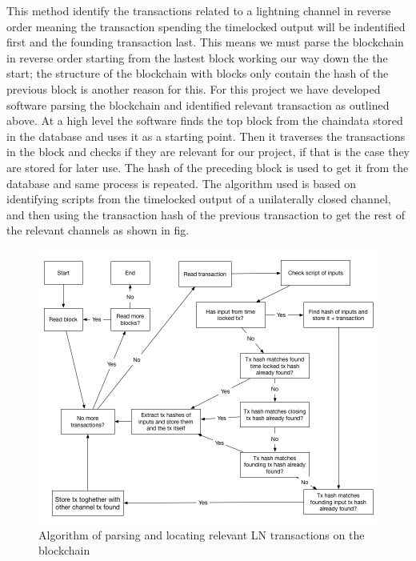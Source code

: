 This method identify the transactions related to a lightning channel in reverse order meaning the transaction spending the timelocked output will be indentified first and the founding transaction last. 
This means we must parse the blockchain in reverse order starting from the lastest block working our way down the the start; the structure of the blockchain with blocks only contain the hash of the previous block is another reason for this.
For this project we have developed software parsing the blockchain and identified relevant transaction as outlined above.
At a high level the software finds the top block from the chaindata stored in the database and uses it as a starting point.
Then it traverses the transactions in the block and checks if they are relevant for our project, if that is the case they are stored for later use. The hash of the preceding block is used to get it from the database and same process is repeated.
The algorithm used is based on identifying scripts from the timelocked output of a unilaterally closed channel, and then using the transaction hash of the previous transaction to get the rest of the relevant channels as shown in fig. 

\begin{figure}[h]
    \centering
    \includegraphics[width=14cm]{figures/algorithm.png}
    \caption{Algorithm of parsing and locating relevant LN transactions on the blockchain}
    \label{fig:htlc_bc}
\end{figure}


